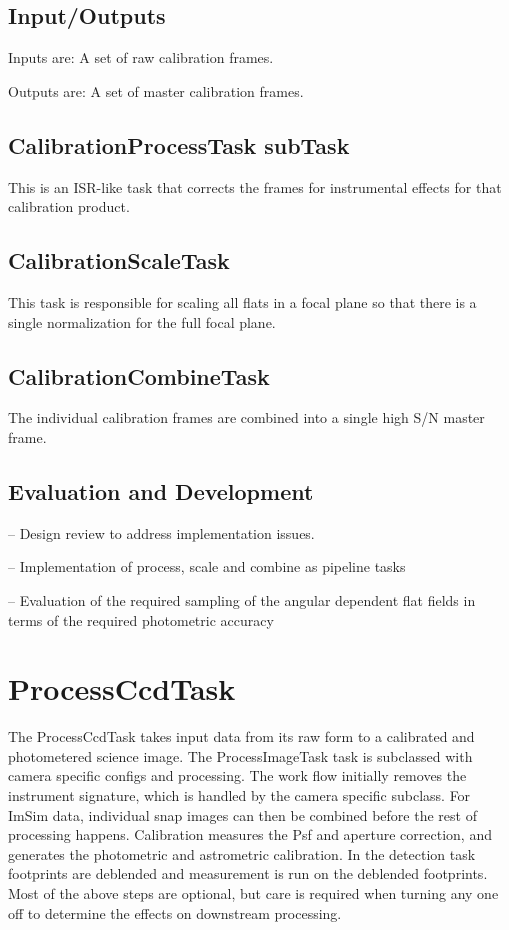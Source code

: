 \documentclass[prd, nofootinbib, floatfix, 11pt,tightenlines,times]{article}
\begin{document}
\subsection{Input/Outputs}
Inputs are: A set of raw calibration frames.

Outputs are: A set of master calibration frames.

\subsection{CalibrationProcessTask subTask}
This is an ISR-like task that corrects the frames for instrumental effects for that calibration
product.

\subsection{CalibrationScaleTask}
This task is responsible for
scaling all flats in a focal plane so that there is a single normalization for the full focal plane.

\subsection{CalibrationCombineTask}
The individual calibration frames are combined into a single high S/N master frame. 

\subsection{Evaluation and Development}

-- Design review to address implementation issues.

-- Implementation of process, scale and combine as pipeline tasks

-- Evaluation of the required sampling of the angular dependent flat
fields in terms of the required photometric accuracy



\section{ProcessCcdTask\label{processccdsec}} 
The ProcessCcdTask takes input data from its raw form to a calibrated
and photometered science image. The ProcessImageTask task is
subclassed with camera specific configs and processing. The work flow
initially removes the instrument signature, which is handled by the
camera specific subclass.  For ImSim data, individual snap images can
then be combined before the rest of processing happens. Calibration
measures the Psf and aperture correction, and generates the
photometric and astrometric calibration.  In the detection task
footprints are deblended and measurement is run on the deblended
footprints.  Most of the above steps are optional, but care is
required when turning any one off to determine the effects on downstream processing.
\end{document}

